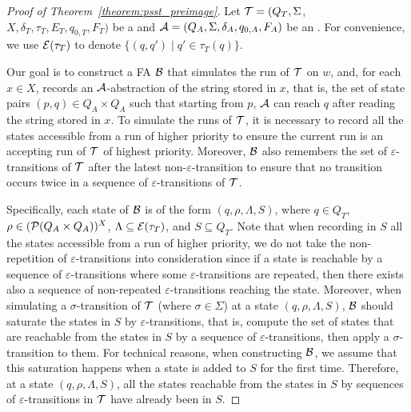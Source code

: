 \begin{proof}[Proof of Theorem~\ref{theorem:psst_preimage}]
Let $\mathcal{T} = (Q_T, \Sigma$, $X, \delta_T, \tau_T, E_T,  q_{0, T}, F_T)$ be a \PSST{} and $\mathcal{A}
  = (Q_A, \Sigma, \delta_A, q_{0, A}, F_A)$ be an \FA{}. For convenience, we use $\mathcal{E}(\tau_T)$ to denote $\{(q, q') \mid q' \in \tau_T(q)\}$.

Our goal is to construct a FA $\mathcal{B}$ that simulates the run of $\mathcal{T}$ on $w$, and, for each $x \in X$, records an $\mathcal{A}$-abstraction of the string stored in $x$, that is, the set of state pairs $(p, q) \in Q_A \times Q_A$ such that starting from $p$, $\mathcal{A}$ can reach $q$ after reading the string stored in $x$. To simulate the runs of $\mathcal{T}$, it is necessary to record all the states accessible from a run of higher priority to ensure the current run is an accepting run of $\mathcal{T}$ of highest priority. Moreover, $\mathcal{B}$ also remembers the set of $\varepsilon$-transitions of $\mathcal{T}$ after the latest non-$\varepsilon$-transition to ensure that no transition occurs twice in a sequence of $\varepsilon$-transitions of $\mathcal{T}$.

Specifically, each state of $\mathcal{B}$ is of the form $(q, \rho, \Lambda, S)$, where $q \in Q_T$, $\rho \in (\mathcal{P}(Q_A \times Q_A ))^{X}$, $\Lambda \subseteq \mathcal{E}(\tau_T)$, and $S \subseteq Q_T$. Note that when recording in $S$ all the states accessible from a run of higher priority, we do not take the non-repetition of $\varepsilon$-transitions into consideration since if a state is reachable by a sequence of $\varepsilon$-transitions where some $\varepsilon$-transitions are repeated, then there exists also a sequence of non-repeated $\varepsilon$-transitions reaching the state. Moreover, when simulating a $\sigma$-transition of $\mathcal{T}$ (where $\sigma \in \Sigma$) at a state $(q, \rho, \Lambda, S)$, $\mathcal{B}$ should saturate the states in $S$ by $\varepsilon$-transitions, that is, compute the set of states that are reachable from the states in $S$ by a sequence of $\varepsilon$-transitions, then apply a $\sigma$-transition to them. For technical reasons, when constructing $\mathcal{B}$, we assume that this saturation happens when a state is added to $S$ for the first time. Therefore, at a state $(q, \rho, \Lambda, S)$, all the states reachable from the states in $S$ by sequences of $\varepsilon$-transitions in $\mathcal{T}$ have already been in $S$.


\end{proof}
